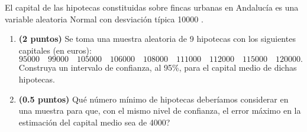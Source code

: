 
El capital de las hipotecas constituidas sobre fincas urbanas en Andalucía es una variable aleatoria Normal con desviación típica 10000 \texteuro{}.
\begin{enumerate}[label=\alph*)]
\item \textbf{(2 puntos)} Se toma una muestra aleatoria de 9 hipotecas con los siguientes capitales (en euros):
\[
95000\quad99000\quad105000\quad106000\quad108000\quad111000\quad112000\quad115000\quad120000.
\]
Construya un intervalo de confianza, al 95\%, para el capital medio de dichas hipotecas.
\item \textbf{(0.5 puntos)} \textquestiondown{}Qué número mínimo de hipotecas deberíamos considerar en una muestra para que, con el mismo nivel de confianza, el error máximo en la estimación del capital medio sea de 4000\texteuro{}?
\end{enumerate}
